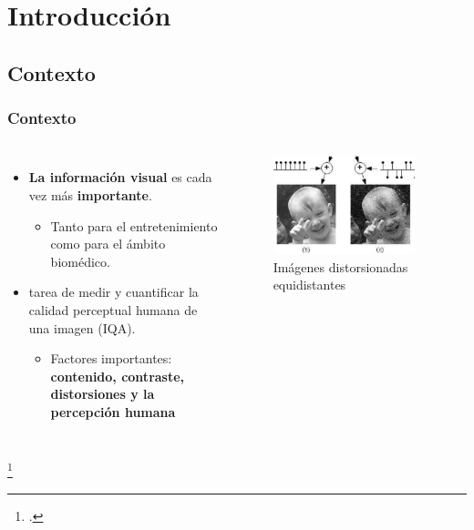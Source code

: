 \section[Introducción]{Introducción}
\subsection[Contexto]{Contexto}
\begin{frame}
    \frametitle{Contexto}
    \begin{columns}
    \begin{itemize}
      \item \textbf{La información visual} es cada vez más \textbf{importante}.
        \begin{itemize}
          \item Tanto para el entretenimiento como para el ámbito biomédico.
        \end{itemize}
      \item{tarea de medir y cuantificar} la calidad perceptual humana de una imagen (IQA). 
        \begin{itemize}
          \item Factores importantes: \textbf{contenido, contraste, distorsiones y la percepción humana}
        \end{itemize}
    \end{itemize}
    \begin{figure}
      \begin{center}
        \includegraphics[width=0.9\textwidth]{imagenes/chapter1/failure_minkowski_metricBIG}
      \end{center}
      \caption{Imágenes distorsionadas equidistantes\footnotemark}
    \end{figure}
  \end{columns}
  \vspace{-.2cm}
  \footcitetext{MinkowskiFailure}
\end{frame}

